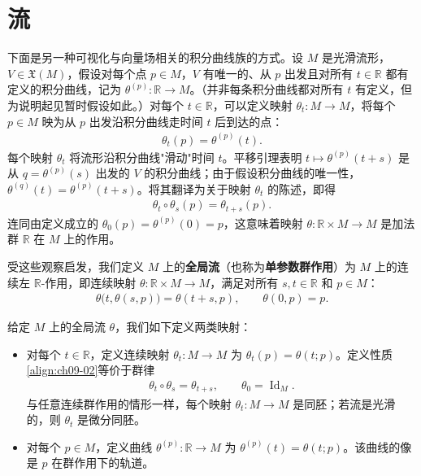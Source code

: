 \documentclass[../../main.tex]{subfiles}
\begin{document}
\section{流}\label{section:ch09-流}

下面是另一种可视化与向量场相关的积分曲线族的方式。设 $M$ 是光滑流形，$V\in\mathfrak{X}(M)$，假设对每个点 $p\in M$，$V$ 有唯一的、从 $p$ 出发且对所有 $t\in\mathbb{R}$ 都有定义的积分曲线，记为 $\theta^{(p)}\colon\mathbb{R}\to M$。（并非每条积分曲线都对所有 $t$ 有定义，但为说明起见暂时假设如此。）对每个 $t\in\mathbb{R}$，可以定义映射 $\theta_t\colon M\to M$，将每个 $p\in M$ 映为从 $p$ 出发沿积分曲线走时间 $t$ 后到达的点：
\begin{align*}
\theta_t(p)=\theta^{(p)}(t).
\end{align*}
每个映射 $\theta_t$ 将流形沿积分曲线"滑动"时间 $t$。平移引理表明 $t\mapsto\theta^{(p)}(t+s)$ 是从 $q=\theta^{(p)}(s)$ 出发的 $V$ 的积分曲线；由于假设积分曲线的唯一性，$\theta^{(q)}(t)=\theta^{(p)}(t+s)$。将其翻译为关于映射 $\theta_t$ 的陈述，即得
\begin{align*}
\theta_t\circ\theta_s(p)=\theta_{t+s}(p).
\end{align*}
连同由定义成立的 $\theta_0(p)=\theta^{(p)}(0)=p$，这意味着映射 $\theta\colon\mathbb{R}\times M\to M$ 是加法群 $\mathbb{R}$ 在 $M$ 上的作用。

受这些观察启发，我们定义 $M$ 上的\textbf{全局流}（也称为\textbf{单参数群作用}）为 $M$ 上的连续左 $\mathbb{R}$-作用，即连续映射 $\theta\colon\mathbb{R}\times M\to M$，满足对所有 $s,t\in\mathbb{R}$ 和 $p\in M$：
\begin{align}
\theta\bigl(t,\theta(s,p)\bigr)=\theta(t+s,p),\qquad\theta(0,p)=p. \label{align:ch09-02}
\end{align}

给定 $M$ 上的全局流 $\theta$，我们如下定义两类映射：
\begin{itemize}
\item 对每个 $t\in\mathbb{R}$，定义连续映射 $\theta_t\colon M\to M$ 为 $\theta_t(p)=\theta(t;p)$。定义性质\eqref{align:ch09-02}等价于群律
\begin{align}
\theta_t\circ\theta_s=\theta_{t+s},\qquad \theta_0=\operatorname{Id}_M. \label{align:ch09-03}
\end{align}
与任意连续群作用的情形一样，每个映射 $\theta_t\colon M\to M$ 是同胚；若流是光滑的，则 $\theta_t$ 是微分同胚。

\item 对每个 $p\in M$，定义曲线 $\theta^{(p)}\colon\mathbb{R}\to M$ 为 $\theta^{(p)}(t)=\theta(t;p)$。该曲线的像是 $p$ 在群作用下的轨道。
\end{itemize}
\end{document}
